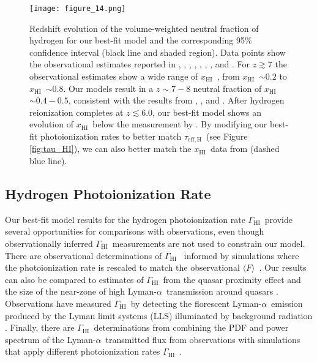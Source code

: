 \documentclass[twocolumn]{aastex62}
\newcommand\Lya{Lyman-$\alpha$}
\newcommand\Fmean{$\langle F \rangle$~}
\newcommand\GammaHI{$\Gamma_{\mathrm{HI}}$~}
\newcommand\xHI{$x_{\mathrm{HI}}$~}
\newcommand\taueffH{$\tau_{\mathrm{eff,H}}$~}
\begin{document}
\begin{figure}
\texttt{[image: figure\_14.png]}
\caption{Redshift evolution of the volume-weighted neutral fraction of hydrogen for our best-fit model and the corresponding 95\% confidence interval (black line and shaded region). 
Data points show the observational estimates reported in \cite{Fan+2006}, \cite{McGreer+2011, McGreer+2015}, \cite{Greig+2017, Greig+2019}, \cite{Mason+2018, Mason+2019},
 \cite{Hoag+2019}, \cite{jung2020}, \cite{Yang+2020a}, and \cite{Wang+2020}.
For $z\gtrsim 7$ the observational estimates show a wide range of \xHI, from \xHI$\sim 0.2$ to \xHI$\sim0.8$.
Our models result in a $z\sim7-8$ neutral fraction of \xHI$\sim0.4 -0.5$,
consistent with the results from \cite{Greig+2017}, \cite{jung2020}, and \cite{Yang+2020a}.
After hydrogen reionization completes at
$z\lesssim 6.0$,
our best-fit model shows an evolution of \xHI below the measurement by \cite{Fan+2006}.
By modifying our best-fit photoionization rates to better match 
\taueffH (see Figure \ref{fig:tau_HI}), we can also better match the
\xHI data from \cite{Fan+2006} (dashed blue line).}
\label{fig:HI_fraction}
\end{figure}

 


\subsection{Hydrogen Photoionization Rate}
\label{sec:Gamma_HI }

Our best-fit model results for the hydrogen photoionization rate \GammaHI provide
several opportunities for comparisons with observations, even though observationally
inferred \GammaHI measurements are not used to constrain our model.
There are observational determinations of \GammaHI
informed by simulations where the photoionization rate is rescaled to
match the observational \Fmean \citep{Becker+2013b, daloisio2018a}.
Our results can also be compared to estimates of \GammaHI from the quasar proximity effect and
the size of the near-zone of high \Lya\ transmission around quasars \citep{Calverley+2011, Wyite+2011}.
Observations have measured \GammaHI by detecting the florescent 
\Lya\ emission produced by the Lyman limit systems (LLS) illuminated by background radiation \citep{Gallego+2021}.
Finally, there are \GammaHI determinations from combining the PDF and power spectrum of the \Lya\ 
transmitted flux from observations with simulations that apply different photoionization rates
\GammaHI \citep{Gaikwad+2017}.
\end{document}
